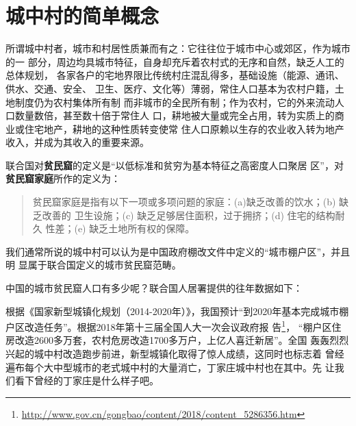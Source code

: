\chapter{城中村的简单概念}

所谓城中村者，城市和村居性质兼而有之：它往往位于城市中心或郊区，作为城市的一
部分，周边均具城市特征，自身却充斥着农村式的无序和自然，缺乏人工的总体规划，
各家各户的宅地界限比传统村庄混乱得多，基础设施（能源、通讯、供水、交通、安全、
卫生、医疗、文化等）薄弱，常住人口基本为农村户籍，土地制度仍为农村集体所有制
而非城市的全民所有制；作为农村，它的外来流动人口数量数倍，甚至数十倍于常住人
口，耕地被大量或完全占用，转为实质上的商业或住宅地产，耕地的这种性质转变使常
住人口原赖以生存的农业收入转为地产收入，并成为其收入的重要来源。

联合国对\textbf{贫民窟}的定义是“以低标准和贫穷为基本特征之高密度人口聚居
区”，对\textbf{贫民窟家庭}所作的定义为：
\begin{quotation}
  贫民窟家庭是指有以下一项或多项问题的家庭：(a)缺乏改善的饮水；(b) 缺乏改善的
  卫生设施；(c) 缺乏足够居住面积，过于拥挤；(d) 住宅的结构耐久
  性差；(e) 缺乏土地所有权的保障。
\end{quotation}

我们通常所说的城中村可以认为是中国政府棚改文件中定义的“城市棚户区”，并且明
显属于联合国定义的城市贫民窟范畴。\cite{unandchina}


中国的城市贫民窟人口有多少呢？联合国人居署提供的往年数据如下：
\begin{table}[!ht] \centering
  \caption{1990-2014年中国城市贫民窟人口比例及数量}
\end{table}

根据《国家新型城镇化规划（2014-2020年）》，我国预计“到2020年基本完成城市棚
户区改造任务”。根据2018年第十三届全国人大一次会议政府报
告\footnote{\url{http://www.gov.cn/gongbao/content/2018/content_5286356.htm}}，
“棚户区住房改造2600多万套，农村危房改造1700多万户，上亿人喜迁新居”。全国
轰轰烈烈兴起的城中村改造跑步前进，新型城镇化取得了惊人成绩，这同时也标志着
曾经遍布每个大中型城市的老式城中村的大量消亡，丁家庄城中村也在其中。先
让我们看下曾经的丁家庄是什么样子吧。

